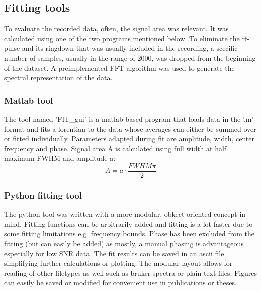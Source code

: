         \subsection{Fitting tools}
            To evaluate the recorded data, often, the signal area was relevant. It was calculated using one of the two programs mentioned below. To eliminate the rf-pulse and its ringdown that was usually included in the recording, a scecific number of samples, usually in the range of 2000, was dropped from the beginning of the dataset. A preimplemented FFT algorithm was used to generate the spectral representation of the data.
            \subsubsection{Matlab tool}
            The tool named 'FIT\_gui' is a matlab based program that loads data in the '.m' format and fits a lorentian to the data whose averages can either be summed over or fitted individually. Parameters adapted during fit are amplitude, width, center frequency and phase. Signal area A is calculated using full width at half maximum FWHM and amplitude a:
            \begin{equation}
                A=a\cdot\frac{FWHM\pi}{2}
            \end{equation}
            \subsubsection{Python fitting tool}
            The python tool was written with a more modular, obkect oriented concept in mind. Fitting functions can be arbitrarily added and fitting is a lot faster due to some fitting limitations e.g. frequency bounds. Phase has been excluded from the fitting (but can easily be added) as mostly, a manual phasing is advantageous especially for low SNR data. The fit results can be saved in an ascii file simplifying further calculations or plotting.
            The modular layout allows for reading of other filetypes as well such as bruker spectra or plain text files.
            Figures can easily be saved or modified for convenient use in publications or theses.
